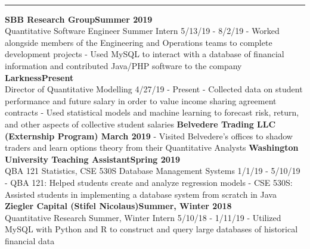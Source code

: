 \documentclass[11pt]{article}
\begin{document}
\begin{titlepage}
\begin{addmargin}[1em]{0em}
\begin{center}
\begin{minipage}[b]{0.3\textwidth}
				\end{minipage}
			\end{center}
		\end{addmargin}
		\vspace{-10pt}
		\noindent
		\\\rule{\textwidth}{0.4pt}
		\begin{addmargin}[1em]{0em}
    		\textbf{SBB Research Group\hfill Summer 2019}\\
Quantitative Software Engineer Summer Intern \hfill {\small{5/13/19 - 8/2/19}}\newline
- Worked alongside members of the Engineering and Operations teams to complete development projects\newline
- Used MySQL to interact with a database of financial information and contributed Java/PHP software to the company\newline
            \textbf{Larkness\hfill Present}\\
Director of Quantitative Modelling \hfill {\small{4/27/19 - Present}}\newline
- Collected data on student performance and future salary in order to value income sharing agreement contracts\newline
- Used statistical models and machine learning to forecast risk, return, and other aspects of collective student salaries\newline
            \textbf{Belvedere Trading LLC (Externship Program) \hfill March 2019}\newline
- Visited Belvedere's offices to shadow traders and learn options theory from their Quantitative Analysts\newline
		    \textbf{Washington University Teaching Assistant\hfill Spring 2019}\\
QBA 121 Statistics, CSE 530S Database Management Systems \hfill {\small{1/1/19 - 5/10/19}}\newline
- QBA 121: Helped students create and analyze regression models\newline
- CSE 530S: Assisted students in implementing a database system from scratch in Java\newline
			\textbf{Ziegler Capital (Stifel Nicolaus)\hfill Summer, Winter 2018}\\
Quantitative Research Summer, Winter Intern \hfill {\small{5/10/18 - 1/11/19}}\newline
- Utilized MySQL with Python and R to construct and query large databases of historical financial data \newline

\end{addmargin}
\end{titlepage}
\end{document}
